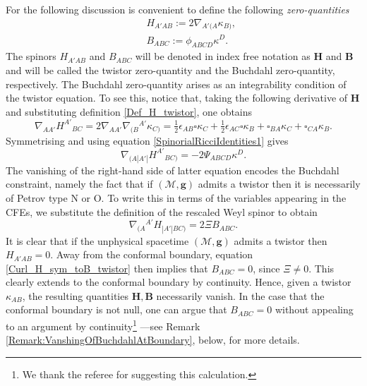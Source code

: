 \documentclass[10pt,a4paper]{article}
\theoremstyle{plain}
\def\bmg{{\bm g}}
\def\bmB{{\bm B}}
\def\bmH{{\bm H}}
\begin{document}
For the following discussion is convenient to define the following
\emph{zero-quantities}
\begin{subequations}
  \begin{eqnarray}
   && H_{A'AB} := 2
    \nabla_{A'(A}\kappa_{B)},\label{Def_H_twistor}\\ && B_{ABC}
    := \phi_{ABCD}\kappa^D.\label{Def_B_twistor}
    \end{eqnarray}
\end{subequations}
The spinors $H_{A'AB}$ and $B_{ABC}$ will be denoted in index free
notation as $\bmH$ and $\bmB$ and will be called the twistor
zero-quantity and the Buchdahl zero-quantity, respectively.  The
Buchdahl zero-quantity arises as an integrability condition of the
twistor equation.  To see this, notice that, taking the following
derivative of $\bmH$ and substituting definition
\eqref{Def_H_twistor}, one obtains
  \begin{equation}\label{curl_H_twistor}
  \nabla_{AA'}H^{A'}{}_{BC}= 2 \nabla_{AA'}\nabla_{(B}{}^{A'}\kappa
  _{C)} = \tfrac{1}{2} \epsilon _{AB} \square \kappa _{C}  +
  \tfrac{1}{2}  \epsilon _{AC} \square \kappa _{B} +
  \square_{BA}\kappa _{C} + \square_{CA}\kappa _{B}.
  \end{equation}
  Symmetrising and using equation \eqref{SpinorialRicciIdentities1} gives
  \[
  \nabla_{(A|A'|}H^{A'}{}_{BC)}= - 2\Psi_{ABCD}\kappa^D.
  \]
  The vanishing of the right-hand side of latter equation encodes the
  Buchdahl constraint, namely the fact that if $(\mathcal{M},\bmg)$
  admits a twistor then it is necessarily of Petrov type N or O. To
  write this in terms of the variables appearing in the CFEs,
  we substitute the definition of the rescaled Weyl spinor
  to obtain
  \begin{equation}\label{Curl_H_sym_toB_twistor}
  \nabla_{(A}{}^{A'}H_{|A'|BC)} = 2\Xi B_{ABC}.
  \end{equation}
  It is clear that if the unphysical spacetime
  $(\mathcal{M},\bmg)$ admits a twistor then $H_{A'AB}=0$. Away from the
  conformal boundary, equation \eqref{Curl_H_sym_toB_twistor} then implies
  that $B_{ABC}=0$, since $\Xi\neq 0$. This clearly extends to the conformal boundary
  by continuity. Hence, given a twistor $\kappa_{AB}$, the resulting quantities
  $\bmH, \bmB$ necessarily vanish. In the case that the conformal boundary is not null, 
  one can argue that $B_{ABC}=0$ without appealing to an argument by continuity\footnote{We thank the referee for suggesting this calculation.} ---see Remark \ref{Remark:VanshingOfBuchdahlAtBoundary}, below, for more details. 
  
\end{document}
